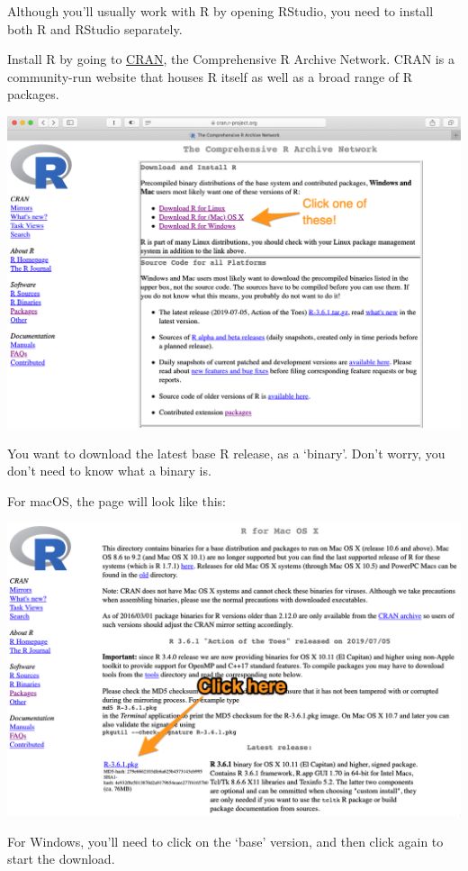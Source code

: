 \documentclass[]{book}
\begin{document}
Although you'll usually work with R by opening RStudio, you need to install both R and RStudio separately.

Install R by going to \href{https://cran.r-project.org}{CRAN}, the Comprehensive R Archive Network. CRAN is a community-run website that houses R itself as well as a broad range of R packages.

\includegraphics[width=15.69in]{atlas/r_cran}

You want to download the latest base R release, as a `binary'. Don't worry, you don't need to know what a binary is.

For macOS, the page will look like this:

\includegraphics[width=15.68in]{atlas/r_cran_macos}

For Windows, you'll need to click on the `base' version, and then click again to start the download.
\end{document}
